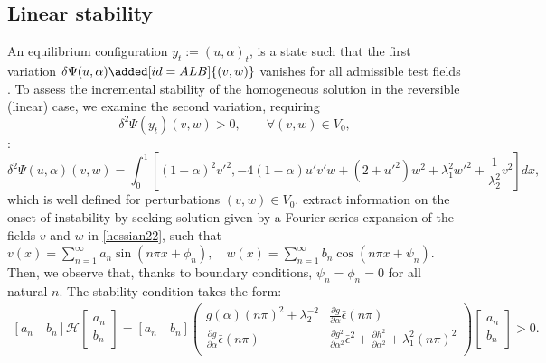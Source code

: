 \subsection{Linear stability}
An equilibrium configuration $y_t:=(u,\alpha)_t$, is a state such that the first variation $\delta \Psi(u,\alpha)\added[id=ALB]{(v, w)}$ vanishes for all admissible test fields  . 
To assess the incremental stability of the homogeneous solution in the reversible (linear) case, we examine the  second variation, requiring
\begin{equation}
\delta^2 \Psi(y_t)(v,w)>0, \qquad  \forall (v,w)\in V_0,
\label{eqn:linear_second_order_stability}
\end{equation} 
  :
\begin{equation}
\delta^2 \Psi(u,\alpha)(v,w)=\int_0^1 \left[(1-\alpha)^2v'^2 ,
- 4(1-\alpha)u' v'w+(2+ u'^2)w^2+\lambda_1^2w'^2 +\frac{1}{\lambda_2^2} v^2 \right]dx,
\label{hessian22}
\end{equation}
 which is
well defined for perturbations $(v, w)\in V_0$.
 extract information on the onset of instability by seeking solution given by a Fourier series  expansion of the fields $v$ and $w$ in \eqref{hessian22}, such that $v(x)=\sum_{n=1}^{\infty} a_{n} \sin \left(n \pi x+\phi_{n}\right), \quad w(x)=\sum_{n=1}^{\infty} b_{n} \cos \left(n \pi x+\psi_{n}\right)$. Then, we observe that, thanks to boundary conditions, $\psi_{n}=\phi_{n}=0$ for all natural $n$. The stability condition  takes the form:
\begin{align}\left[ a_n \quad b_n \right] \mathcal{H} \left[ \begin{array}{c} a_n \\ b_n \end{array} \right]=\left[ a_n \quad b_n \right]\left(
\begin{array}{cc}
g(\alpha)(n\pi)^2+\lambda_2^{-2}  & \frac{\partial g}{\partial \alpha}\bar\epsilon(n\pi)  \\
\frac{\partial g}{\partial \alpha}\bar\epsilon(n\pi)  &   \frac{\partial g^2}{\partial \alpha^2}\bar\epsilon^2+ \frac{\partial h^2}{\partial \alpha^2}+\lambda_1^2(n\pi)^2  \\
\end{array}
\right)\left[ \begin{array}{c} a_n \\ b_n \end{array} \right]>0.\label{hessian1}\end{align}
